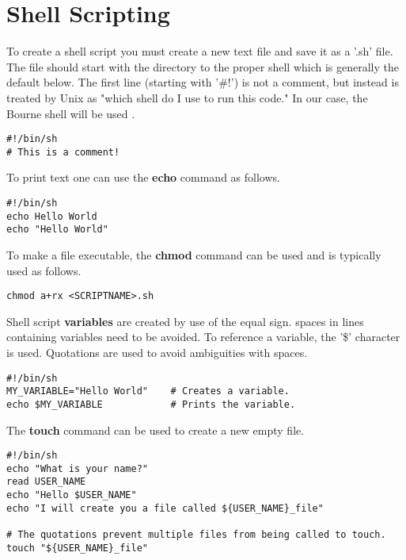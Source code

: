 \section{Shell Scripting}

To create a shell script you must create a new text file and save it as a '.sh' file. The file should start with the directory to the proper shell which is generally the default below. The first line (starting with '\#!') is not a comment, but instead is treated by Unix as "which shell do I use to run this code." In our case, the Bourne shell will be used \cite{linux: shell scripting}.
\begin{lstlisting}
#!/bin/sh
# This is a comment!
\end{lstlisting}

To print text one can use the \textbf{echo} command as follows.
\begin{lstlisting}
#!/bin/sh
echo Hello World
echo "Hello World"
\end{lstlisting}

To make a file executable, the \textbf{chmod} command can be used and is typically used as follows.
\begin{lstlisting}
chmod a+rx <SCRIPTNAME>.sh
\end{lstlisting}

Shell script \textbf{variables} are created by use of the equal sign. spaces in lines containing variables need to be avoided. To reference a variable, the '\$' character is used. Quotations are used to avoid ambiguities with spaces.
\begin{lstlisting}
#!/bin/sh
MY_VARIABLE="Hello World"    # Creates a variable.
echo $MY_VARIABLE            # Prints the variable.
\end{lstlisting}




The \textbf{touch} command can be used to create a new empty file.
\begin{lstlisting}
#!/bin/sh
echo "What is your name?"
read USER_NAME
echo "Hello $USER_NAME"
echo "I will create you a file called ${USER_NAME}_file"

# The quotations prevent multiple files from being called to touch.
touch "${USER_NAME}_file"
\end{lstlisting}